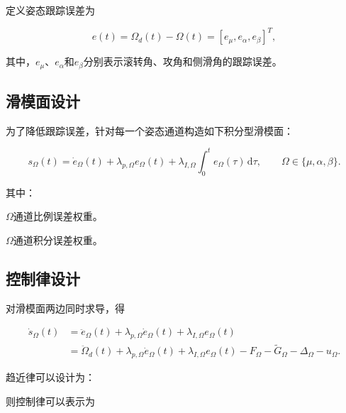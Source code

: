 \documentclass[11pt,a4paper,UTF8]{ctexart}
\begin{document}
定义姿态跟踪误差为

\begin{equation}
  e(t)=\Omega_d(t)-\Omega(t)
  =\left[e_{\mu},e_{\alpha},e_{\beta}\right]^T,
\end{equation}

其中，$e_{\mu}$、$e_{\alpha}$和$e_{\beta}$分别表示滚转角、攻角和侧滑角的跟踪误差。

\subsection{滑模面设计}

为了降低跟踪误差，针对每一个姿态通道构造如下积分型滑模面：

\begin{equation}
  s_{\Omega}(t)
  =\dot e_{\Omega}(t)
  +\lambda_{p,\Omega}e_{\Omega}(t)
  +\lambda_{I,\Omega}\int_{0}^{t}e_{\Omega}(\tau)\,\mathrm{d}\tau,
  \qquad \Omega\in\{\mu,\alpha,\beta\}.
\end{equation}

其中：

\begin{description}[style=nextline,leftmargin=6.4em,labelsep=0.8em]
  \item[$\lambda_{p,\Omega}>0$] $\Omega$通道比例误差权重。
  \item[$\lambda_{I,\Omega}>0$] $\Omega$通道积分误差权重。
\end{description}

\subsection{控制律设计}

对滑模面两边同时求导，得

\begin{equation}
\begin{aligned}
  \dot{s}_{\Omega}(t)
  &=\ddot e_{\Omega}(t)
    +\lambda_{p,\Omega}\dot e_{\Omega}(t)
    +\lambda_{I,\Omega}e_{\Omega}(t)\\
  &=\ddot{\Omega}_{d}(t)
    +\lambda_{p,\Omega}\dot e_{\Omega}(t)
    +\lambda_{I,\Omega}e_{\Omega}(t)
    -F_{\Omega}-\widetilde{G}_{\Omega}-\Delta_{\Omega}-u_{\Omega}.
\end{aligned}
\end{equation}

趋近律可以设计为：


则控制律可以表示为
\end{document}
